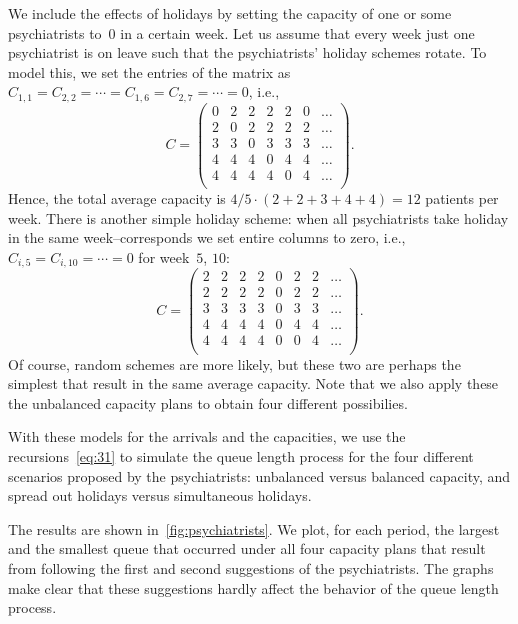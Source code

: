 \documentclass[queueing-book.tex]{subfiles}
\begin{document}
We include the effects of holidays by setting the capacity of one or some  psychiatrists to~$0$ in a certain week.
Let us assume that every week just one psychiatrist is on leave such that the psychiatrists' holiday schemes rotate.
To model this, we set the entries of the matrix as $C_{1,1}=C_{2,2}=\cdots=C_{1,6}=C_{2,7} =\cdots = 0$, i.e.,
\begin{equation}\label{eq:11}
C =
 \begin{pmatrix}
 0 & 2 & 2 & 2 & 2 & 0 & \ldots \\
 2 & 0 & 2 & 2 & 2 & 2 & \ldots\\
 3 & 3 & 0 & 3 & 3 & 3 & \ldots\\
 4 & 4 & 4 & 0 & 4 & 4 & \ldots\\
 4 & 4 & 4 & 4 & 0 & 4 & \ldots\\
 \end{pmatrix}.
\end{equation}
Hence, the total average capacity is $4/5 \cdot (2+2+3+4+4) = 12$ patients per week.
There is another simple holiday scheme: when all psychiatrists take holiday in the same week--corresponds we  set  entire columns to zero, i.e., $C_{i,5}=C_{i,10}=\cdots=0$ for week~$5$, $10$:
\begin{equation}\label{eq:19}
C =
 \begin{pmatrix}
 2 & 2 & 2 & 2 & 0 &2 & 2 & \ldots \\
 2 & 2 & 2 & 2 & 0 &2 & 2 & \ldots\\
 3 & 3 & 3 & 3 & 0 & 3 & 3 & \ldots\\
 4 & 4 & 4 & 4 & 0 &4 & 4 & \ldots\\
 4 & 4 & 4 & 4 & 0 &0 & 4 & \ldots\\
 \end{pmatrix}.
\end{equation}
Of course, random schemes are more likely, but these two are perhaps the simplest that result in the same average capacity.
Note that we also apply these the unbalanced capacity plans to obtain four different possibilies.

With these  models for the arrivals and the capacities, we  use the recursions~\cref{eq:31} to simulate the queue length process for the four different scenarios proposed by the psychiatrists: unbalanced versus balanced capacity, and spread out holidays versus simultaneous holidays.

The results are shown in~\cref{fig:psychiatrists}.
We plot, for each period, the largest and the smallest queue that occurred under all four capacity plans that result from following the first and second suggestions of the psychiatrists.
The graphs make clear that these suggestions hardly affect the behavior of the queue length process.
\end{document}
